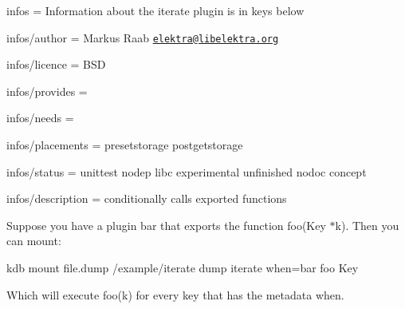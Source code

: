 
\begin{DoxyItemize}
\item infos = Information about the iterate plugin is in keys below
\item infos/author = Markus Raab \href{mailto:elektra@libelektra.org}{\tt elektra@libelektra.\+org}
\item infos/licence = B\+SD
\item infos/provides =
\item infos/needs =
\item infos/placements = presetstorage postgetstorage
\item infos/status = unittest nodep libc experimental unfinished nodoc concept
\item infos/description = conditionally calls exported functions
\end{DoxyItemize}

Suppose you have a plugin bar that exports the function {\ttfamily foo(\+Key $\ast$k)}. Then you can mount\+:


\begin{DoxyCode}
kdb mount file.dump /example/iterate dump iterate when=bar foo Key
\end{DoxyCode}


Which will execute {\ttfamily foo(k)} for every key that has the metadata {\ttfamily when}. 